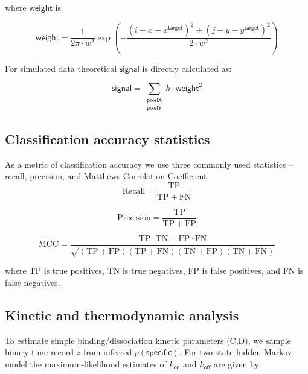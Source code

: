 where $\mathsf{weight}$ is

\begin{equation}
    \mathsf{weight} = \dfrac{1}{2 \pi \cdot w^2} \exp{\left( -\dfrac{(i-x-x^\mathsf{target})^2 + (j-y-y^\mathsf{target})^2}{2 \cdot w^2} \right)}
\end{equation}

For simulated data theoretical $\mathsf{signal}$ is directly calculated as:

\begin{equation}
    \mathsf{signal} =  \sum_{\substack{\mathsf{pixelX} \\ \mathsf{pixelY}}} h \cdot \mathsf{weight}^2
\end{equation}

\subsection{Classification accuracy statistics}

As a metric of classification accuracy we use three commonly used statistics -- recall, precision, and Matthews Correlation Coefficient \citep{Matthews1975-rw}
\begin{equation}
    \mathrm{Recall} = \dfrac{\mathrm{TP}}{\mathrm{TP} + \mathrm{FN}}
\end{equation}

\begin{equation}
    \mathrm{Precision} = \dfrac{\mathrm{TP}}{\mathrm{TP} + \mathrm{FP}}
\end{equation}

\begin{equation}
    \mathrm{MCC} =
        \dfrac{\mathrm{TP} \cdot \mathrm{TN} - \mathrm{FP} \cdot \mathrm{FN}}
        {\sqrt{(\mathrm{TP} + \mathrm{FP}) (\mathrm{TP} + \mathrm{FN}) (\mathrm{TN} + \mathrm{FP}) (\mathrm{TN} + \mathrm{FN})}}
\end{equation}

\noindent
where TP is true positives, TN is true negatives, FP is false positives, and FN is false negatives.

\subsection{Kinetic and thermodynamic analysis}

To estimate simple binding/dissociation kinetic parameters (C,D), we sample binary time record $z$ from inferred $p(\mathsf{specific})$. For two-state hidden Markov model the maximum-likelihood estimates of $k_\mathsf{on}$ and $k_\mathsf{off}$ are given by:


